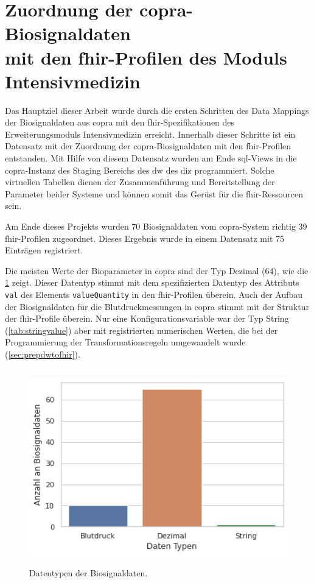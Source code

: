 \section[Zuordnung der \acs{copra}-Biosignaldaten mit den \acs{fhir}-Profilen des Moduls \glqq Intensivmedizin\grqq{}]{Zuordnung der \acs{copra}-Biosignaldaten \\ mit den \acs{fhir}-Profilen des Moduls \glqq Intensivmedizin\grqq{}} \label{sect:resdatamapping}

Das Hauptziel dieser Arbeit wurde durch die ersten Schritten des Data Mappings der Biosignaldaten aus \ac{copra} mit den \ac{fhir}-Spezifikationen des Erweiterungsmoduls \glqq Intensivmedizin\grqq{} erreicht. Innerhalb dieser Schritte ist ein Datensatz mit der Zuordnung der \ac{copra}-Biosignaldaten mit den \ac{fhir}-Profilen entstanden. Mit Hilfe von diesem Datensatz wurden am Ende \ac{sql}-Views in die \ac{copra}-Instanz des Staging Bereichs des \ac{dw} des \ac{diz} programmiert. Solche virtuellen Tabellen dienen der Zusammenführung und Bereitstellung der Parameter beider Systeme und können somit das Gerüst für die \ac{fhir}-Ressourcen sein.

Am Ende dieses Projekts wurden 70 Biosignaldaten vom \ac{copra}-System richtig 39 \ac{fhir}-Profilen zugeordnet. Dieses Ergebnis wurde in einem Datensatz mit 75 Einträgen registriert.

Die meisten Werte der Bioparameter in \ac{copra} sind der Typ Dezimal (64), wie die \ref{fig:signaldatatyps} zeigt. Dieser Datentyp stimmt mit dem spezifizierten Datentyp des Attributs \texttt{val} des Elements \texttt{valueQuantity} in den \ac{fhir}-Profilen überein. Auch der Aufbau der Biosignaldaten für die Blutdruckmessungen in \ac{copra} stimmt mit der Struktur der \ac{fhir}-Profile überein. Nur eine Konfigurationsvariable war der Typ String (\ref{tab:stringvalue}) aber mit registrierten numerischen Werten, die bei der Programmierung der Transformationsregeln umgewandelt wurde (\ref{sec:prepdwtofhir}).

\begin{figure}[ht]
	\centering
	\includegraphics[height=8.5cm]{figures/biosignal_data_types}
	\caption[Datentypen der Biosignaldaten]{Datentypen der Biosignaldaten.}
	\label{fig:signaldatatyps}
\end{figure}

